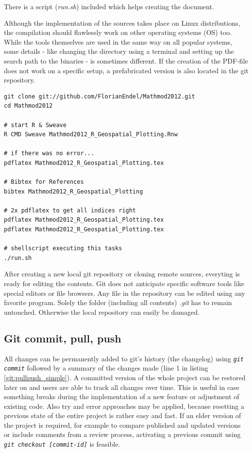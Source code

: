 \documentclass{ifacconf}
\begin{document}
There is a script (\textit{run.sh}) included which helps creating the document.

Although the implementation of the sources takes place on
Linux distributions, the compilation should flawlessly work on other operating systems (OS) too.
While the tools themselves are used in the same way on all popular systems, some details
- like changing the directory using a terminal and setting up the search path to the binaries - is sometimes different.
If the creation of the PDF-file does not work on a specific setup, a prefabricated
version is also located in the git repository. 

\begin{lstlisting}
git clone git://github.com/FlorianEndel/Mathmod2012.git
cd Mathmod2012

# start R & Sweave
R CMD Sweave Mathmod2012_R_Geospatial_Plotting.Rnw

# if there was no error...
pdflatex Mathmod2012_R_Geospatial_Plotting.tex

# Bibtex for References
bibtex Mathmod2012_R_Geospatial_Plotting

# 2x pdflatex to get all indices right
pdflatex Mathmod2012_R_Geospatial_Plotting.tex
pdflatex Mathmod2012_R_Geospatial_Plotting.tex

# shellscript executing this tasks
./run.sh
\end{lstlisting}

After creating a new local git repository or cloning remote sources, everyting is ready for
editing the contents. Git does not anticipate specific software tools like special editors or file browsers. Any file in 
the repository can be edited using any favorite program. Solely the folder (including all contents)
\textit{.git} has to remain untouched. Otherwise the local repository can easily be damaged.

\subsection{Git commit, pull, push}
All changes can be permanently 
added to git's history (the changelog) using \textit{\lstinline!git commit!} followed by a 
summary of the changes made (line 1 in listing \ref{git:pullpush_simple}). 
A committed version of the whole project can be restored later on and users are able to
track all changes over time. This is useful in case something breaks during 
the implementation of a new feature or adjustment of existing code.
Also try and error approaches may be applied, because resetting a previous state of the entire project is 
rather easy and fast. If an elder version of the project is required, for example to compare 
published and updated versions or include comments from a review process, activating  
a previous commit using \textit{\lstinline!git checkout [commit-id]!} is feasible.
\end{document}
